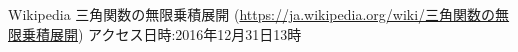 \documentclass[10pt,onecolumn,dvipdfmx]{jsarticle}
\begin{document}
\begin{thebibliography}{9}
 Wikipedia 三角関数の無限乗積展開 (\href{https://ja.wikipedia.org/wiki/%E4%B8%89%E8%A7%92%E9%96%A2%E6%95%B0%E3%81%AE%E7%84%A1%E9%99%90%E4%B9%97%E7%A9%8D%E5%B1%95%E9%96%8B}{https://ja.wikipedia.org/wiki/三角関数の無限乗積展開}) アクセス日時:2016年12月31日13時
\end{thebibliography}
\end{document}
